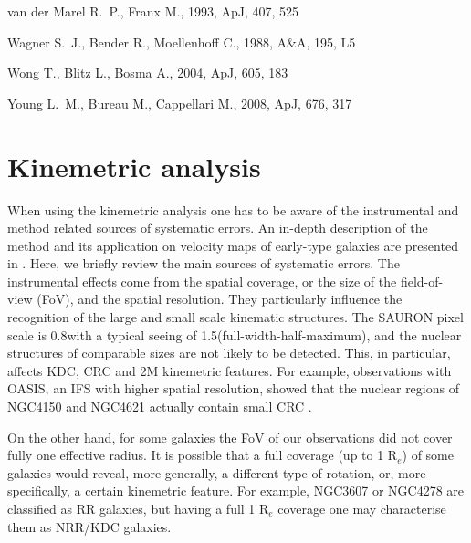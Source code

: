 \documentclass[usenatbib,usegraphicx]{mn2e}
\def\apj{ApJ}           %
\def\aap{A\&A}          %
\begin{document}
\begin{thebibliography}{}
{van der Marel} R.~P.,  {Franx} M.,  1993, \apj, 407, 525

{Wagner} S.~J.,  {Bender} R.,    {Moellenhoff} C.,  1988, \aap, 195, L5

{Wong} T.,  {Blitz} L.,    {Bosma} A.,  2004, \apj, 605, 183

{Young} L.~M.,  {Bureau} M.,    {Cappellari} M.,  2008, \apj, 676, 317

\end{thebibliography}




\appendix

\section{Kinemetric analysis}
\label{A:cav}

When using the kinemetric analysis one has to be aware of the instrumental and method related sources of systematic errors. An in-depth description of the method and its application on velocity maps of early-type galaxies are presented in \citet{2006MNRAS.366..787K,2008MNRAS.390...93K}. Here, we briefly review the main sources of systematic errors. The instrumental effects come from the spatial coverage, or the size of the field-of-view (FoV), and the spatial resolution.  They particularly influence the recognition of the large and small scale kinematic structures. The SAURON pixel scale is 0.8\arcsec with a typical seeing of 1.5\arcsec (full-width-half-maximum), and the nuclear structures of comparable sizes are not likely to be detected. This, in particular, affects KDC, CRC and 2M kinemetric features. For example, observations with OASIS, an IFS with higher spatial resolution, showed that the nuclear regions of NGC4150 and NGC4621 actually contain small CRC \citep{2006MNRAS.373..906M}. 

On the other hand, for some galaxies the FoV of our observations did not cover fully one effective radius. It is possible that a full coverage (up to 1 R$_e$) of some galaxies would reveal, more generally, a different type of rotation, or, more specifically, a certain kinemetric feature. For example, NGC3607 or NGC4278 are classified as RR galaxies, but having a full 1 R$_{e}$ coverage one may characterise them as NRR/KDC galaxies. 
\end{document}
